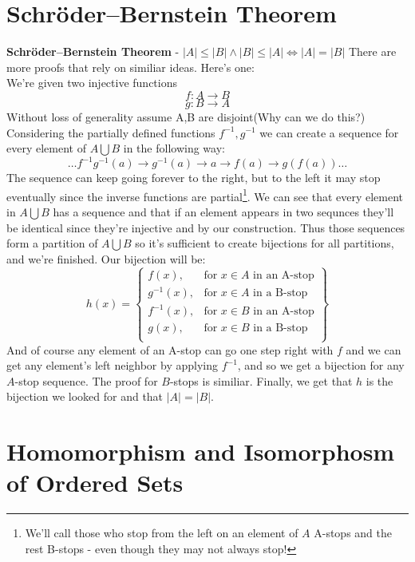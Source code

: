 \documentclass{article}
\begin{document}
\section{Schröder–Bernstein Theorem}
\textbf{Schröder–Bernstein Theorem} - \emph{$|A|\le|B|\land|B|\le|A|\iff|A|=|B|$}
There are more proofs that rely on similiar ideas. Here's one:\\
We're given two injective functions
\[f:A \rightarrow B\]
\[g:B \rightarrow A\]
Without loss of generality assume A,B are disjoint(Why can we do this?)\\
Considering the partially defined functions $f^{-1}, g^{-1}$ we can create a sequence for every element of $A\bigcup B$ in the following way:
$$\ldots f^{-1}g^{-1}(a)\rightarrow g^{-1}(a)\rightarrow a\rightarrow f(a) \rightarrow g(f(a))\ldots$$
The sequence can keep going forever to the right, but to the left it may stop eventually since the inverse functions are partial\footnote[1]{We'll call those who stop from the left on an element of $A$ A-stops and the rest B-stops - even though they may not always stop!}. We can see that every element in $A\bigcup B$ has a sequence and that if an element appears in two sequnces they'll be identical since they're injective and by our construction. Thus those sequences form a partition of $A\bigcup B$ so it's sufficient to create bijections for all partitions, and we're finished. Our bijection will be:\\
\[
    h(x) = \left\{\begin{array}{lr}
        f(x), & \text{for } x\in A\text{ in an A-stop}\\
        g^{-1}(x), & \text{for } x\in A\text{ in a B-stop}\\
        f^{-1}(x), & \text{for } x\in B\text{ in an A-stop}\\
        g(x), & \text{for } x\in B\text{ in a B-stop}\\
        
        \end{array}\right\}
  \]
  And of course any element of an A-stop can go one step right with $f$ and we can get any element's left neighbor by applying $f^{-1}$, and so we get a bijection for any $A$-stop sequence. The proof for $B$-stops is similiar. Finally, we get that $h$ is the bijection we looked for and that $|A|=|B|$.
  
  \newpage
  \section{Homomorphism and Isomorphosm of Ordered Sets}
\end{document}
